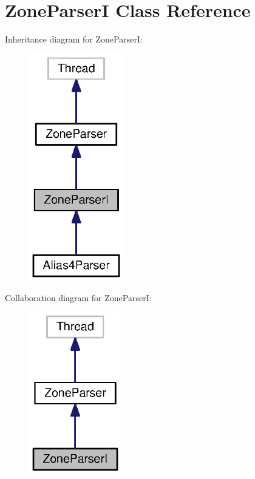 \section{Zone\-Parser\-I Class Reference}
\label{classorg_1_1smallfoot_1_1parser_1_1zone_1_1ZoneParserI}


Inheritance diagram for Zone\-Parser\-I\-:\nopagebreak
\begin{figure}[H]
\begin{center}
\leavevmode
\includegraphics[width=116pt]{classorg_1_1smallfoot_1_1parser_1_1zone_1_1ZoneParserI__inherit__graph}
\end{center}
\end{figure}


Collaboration diagram for Zone\-Parser\-I\-:\nopagebreak
\begin{figure}[H]
\begin{center}
\leavevmode
\includegraphics[width=114pt]{classorg_1_1smallfoot_1_1parser_1_1zone_1_1ZoneParserI__coll__graph}
\end{center}
\end{figure}
